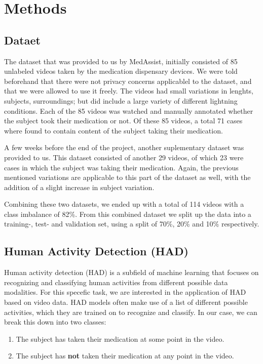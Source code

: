 \documentclass[a4paper,12pt]{article}
\begin{document}
\section{Methods}
\subsection{Dataet}
The dataset that was provided to us by MedAssist, initially consisted of 85 unlabeled videos
taken by the medication dispensary devices. We were told beforehand that there were not
privacy concerns applicablel to the dataset, and that we were allowed to use it freely. 
The videos had small variations in lenghts, subjects, surroundings; but did include a 
large variety of different lightning conditions. Each of the 85 videos was watched 
and manually annotated whether the subject took their medication or not. Of these 85 videos,
a total 71 cases where found to contain content of the subject taking their medication.

A few weeks before the end of the project, another suplementary dataset was provided to us.
This dataset consisted of another 29 videos, of which 23 were cases in which the subject
was taking their medication. Again, the previous mentioned variations are applicable to 
this part of the dataset as well, with the addition of a slight increase in subject variation.

Combining these two datasets, we ended up with a total of 114 videos with a class imbalance
of 82\%. From this combined dataset we split up the data into a training-, test- and validation 
set, using a split of 70\%, 20\% and 10\% respectively.

\subsection{Human Activity Detection (HAD)}
Human activity detection (HAD) is a subfield of machine learning that focuses on recognizing
and classifying human activities from different possible data modalities. For this specefic
task, we are interested in the application of HAD based on video data. HAD models often make
use of a list of different possible activities, which they are trained on to recognize and
classify. In our case, we can break this down into two classes: 

\renewcommand{\labelenumi}{\Roman{enumi}.}
\begin{enumerate}
    \item The subject has taken their medication at some point in the video.
    \item The subject has \textbf{not} taken their medication at any point in the video.
\end{enumerate}
\end{document}
